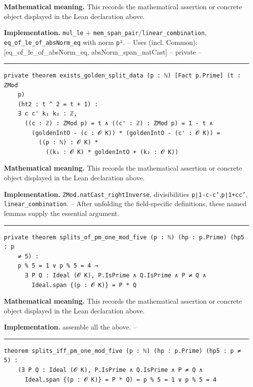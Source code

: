 \documentclass[UTF8,a4paper,11pt,fontset=fandol]{ctexart}
\theoremstyle{definition}
\newcommand{\statementsep}{\par\medskip\hrule\medskip}
\begin{document}
\noindent\textbf{Mathematical meaning.} This records the mathematical assertion or concrete object displayed in the Lean declaration above.\par
\noindent\textbf{Implementation.} \texttt{mul\_\allowbreak{}le} + \texttt{mem\_\allowbreak{}span\_\allowbreak{}pair}/\texttt{linear\_\allowbreak{}combination}, \texttt{eq\_\allowbreak{}of\_\allowbreak{}le\_\allowbreak{}of\_\allowbreak{}absNorm\_\allowbreak{}eq} with norm \texttt{p²}. -- Uses (incl. Common): [eq\_\allowbreak{}of\_\allowbreak{}le\_\allowbreak{}of\_\allowbreak{}absNorm\_\allowbreak{}eq, absNorm\_\allowbreak{}span\_\allowbreak{}natCast] -- private --\par
\statementsep
\begin{verbatim}
private theorem exists_golden_split_data (p : ℕ) [Fact p.Prime] (t : ZMod
    p)
    (ht2 : t ^ 2 = t + 1) :
    ∃ c c' k₁ k₂ : ℤ,
      ((c : ℤ) : ZMod p) = t ∧ ((c' : ℤ) : ZMod p) = 1 - t ∧
        (goldenIntO - (c : 𝓞 K)) * (goldenIntO - (c' : 𝓞 K)) =
          ((p : ℕ) : 𝓞 K) *
            ((k₁ : 𝓞 K) * goldenIntO + (k₂ : 𝓞 K))
\end{verbatim}
\noindent\textbf{Mathematical meaning.} This records the mathematical assertion or concrete object displayed in the Lean declaration above.\par
\noindent\textbf{Implementation.} \texttt{ZMod.\allowbreak{}natCast\_\allowbreak{}rightInverse}, divisibilities \texttt{p∣1-c-c'},\texttt{p∣1+cc'}, \texttt{linear\_\allowbreak{}combination}. -- After unfolding the field-specific definitions, these named lemmas supply the essential argument.\par
\statementsep
\begin{verbatim}
private theorem splits_of_pm_one_mod_five (p : ℕ) (hp : p.Prime) (hp5 : p
    ≠ 5) :
    p % 5 = 1 ∨ p % 5 = 4 →
      ∃ P Q : Ideal (𝓞 K), P.IsPrime ∧ Q.IsPrime ∧ P ≠ Q ∧
        Ideal.span {(p : 𝓞 K)} = P * Q
\end{verbatim}
\noindent\textbf{Mathematical meaning.} This records the mathematical assertion or concrete object displayed in the Lean declaration above.\par
\noindent\textbf{Implementation.} assemble all the above. --\par
\statementsep
\begin{verbatim}
theorem splits_iff_pm_one_mod_five (p : ℕ) (hp : p.Prime) (hp5 : p ≠ 5) :
    (∃ P Q : Ideal (𝓞 K), P.IsPrime ∧ Q.IsPrime ∧ P ≠ Q ∧
      Ideal.span {(p : 𝓞 K)} = P * Q) ↔ p % 5 = 1 ∨ p % 5 = 4
\end{verbatim}
\end{document}
